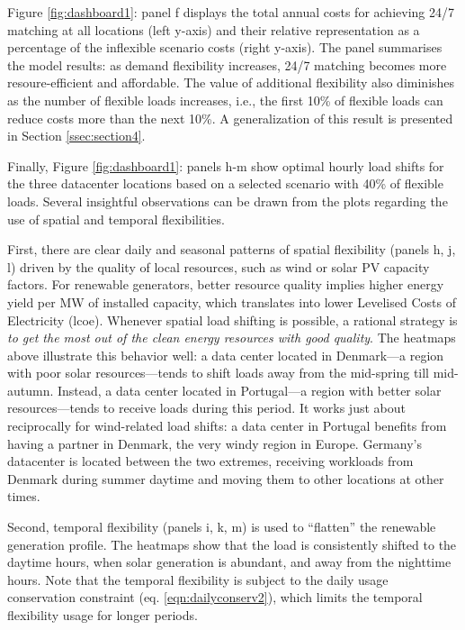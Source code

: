 Figure \ref{fig:dashboard1}: panel f displays the total annual costs for achieving 24/7 matching at all locations (left y-axis) and their relative representation as a percentage of the inflexible scenario costs (right y-axis). The panel summarises the model results: as demand flexibility increases, 24/7 matching becomes more resoure-efficient and affordable. The value of additional flexibility also diminishes as the number of flexible loads increases, i.e., the first 10\% of flexible loads can reduce costs more than the next 10\%. A generalization of this result is presented in Section \ref{ssec:section4}.

Finally, Figure \ref{fig:dashboard1}: panels h-m show optimal hourly load shifts for the three datacenter locations based on a selected scenario with 40\% of flexible loads. Several insightful observations can be drawn from the plots regarding the use of spatial and temporal flexibilities. 

First, there are clear daily and seasonal patterns of spatial flexibility (panels h, j, l) driven by the quality of local resources, such as wind or solar PV capacity factors. For renewable generators, better resource quality implies higher energy yield per MW of installed capacity, which translates into lower Levelised Costs of Electricity (\gls{lcoe}). Whenever spatial load shifting is possible, a rational strategy is \textit{to get the most out of the clean energy resources with good quality}. The heatmaps above illustrate this behavior well: a data center located in Denmark---a region with poor solar resources---tends to shift loads away from the mid-spring till mid-autumn. Instead, a data center located in Portugal---a region with better solar resources---tends to receive loads during this period. It works just about reciprocally for wind-related load shifts: a data center in Portugal benefits from having a partner in Denmark, the very windy region in Europe. 
Germany's datacenter is located between the two extremes, receiving workloads from Denmark during summer daytime and moving them to other locations at other times.

Second, temporal flexibility (panels i, k, m) is used to \enquote{flatten} the renewable generation profile. The heatmaps show that the load is consistently shifted to the daytime hours, when solar generation is abundant, and away from the nighttime hours. Note that the temporal flexibility is subject to the daily usage conservation constraint (eq. \ref{eqn:dailyconserv2}), which limits the temporal flexibility usage for longer periods.


